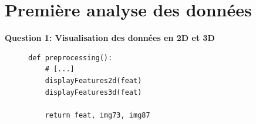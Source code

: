\section{Première analyse des données}

\textbf{Question 1: Visualisation des données en 2D et 3D}

\begin{figure}[!h]
    \begin{verbatim}
def preprocessing():
    # [...]
    displayFeatures2d(feat)
    displayFeatures3d(feat)

    return feat, img73, img87
    \end{verbatim}   
\end{figure}

